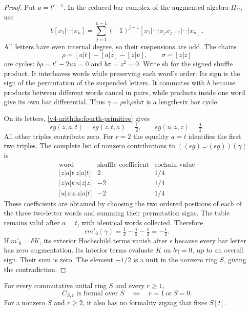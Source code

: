 \begin{proof}
Put $a=t^{r-1}$.
In the reduced bar complex of the augmented algebra $H_C$, use
\[
 b[x_1|\cdots|x_n]
 =\sum_{j=1}^{n-1}(-1)^{j-1}
 [x_1|\cdots|x_jx_{j+1}|\cdots|x_n].
\]
All letters have even internal degree, so their suspensions are odd.
The chains
\[
 \rho=[a|t]-[u|z]-[z|u],\qquad \sigma=[z|z]
\]
are cycles: $b\rho=t^r-2uz=0$ and $b\sigma=z^2=0$.
Write $\mathrm{sh}$ for the signed shuffle product.
It interleaves words while preserving each word's order.
Its sign is the sign of the permutation of the suspended letters.
It commutes with $b$ because products between different words cancel in pairs,
while products inside one word give its own bar differential.
Thus $\gamma=\rho\mathbin{\mathrm{sh}}\rho\mathbin{\mathrm{sh}}\sigma$ is a length-six bar cycle.

On its letters, \eqref{v4-arith:ks:fourth-primitive} gives
\[
 \epsilon g(z,a,t)=\epsilon g(z,t,a)=\tfrac12,
 \qquad \epsilon g(u,z,z)=\tfrac12.
\]
All other triples contribute zero.
For $r=2$ the equality $a=t$ identifies the first two triples.
The complete list of nonzero contributions to
$((\epsilon g)\smile(\epsilon g))(\gamma)$ is
\[
 \begin{array}{c|r|r}
 \text{word}&\text{shuffle coefficient}&\text{cochain value}\\ \hline
 \bigl[z|a|t|z|a|t\bigr]&2&1/4\\
 \bigl[z|a|t|u|z|z\bigr]&-2&1/4\\
 \bigl[u|z|z|z|a|t\bigr]&-2&1/4
 \end{array}
\]
These coefficients are obtained by choosing the two ordered positions
of each of the three two-letter words and summing their permutation signs.
The table remains valid after $a=t$, with identical words collected.
Therefore
\[
 \epsilon m'_6(\gamma)=\tfrac12-\tfrac12-\tfrac12=-\tfrac12.
\]
If $m'_6=\delta K$, its exterior Hochschild terms vanish after $\epsilon$
because every bar letter has zero augmentation.
Its interior terms evaluate $K$ on $b\gamma=0$, up to an overall sign.
Their sum is zero.
The element $-1/2$ is a unit in the nonzero ring $S$, giving the contradiction.
\end{proof}

\begin{theorem}
\label{v4-arith:ks:full-centre-formality}
\ClaimStatusProvedHere{}
For every commutative unital ring $S$ and every $r\geq1$,
\[
 C_{S,r}\text{ is formal over }S
 \quad\Longleftrightarrow\quad r=1\ \text{or}\ S=0.
\]
For a nonzero $S$ and $r\geq2$, it also has no formality zigzag
that fixes $S[t]$.
\end{theorem}

